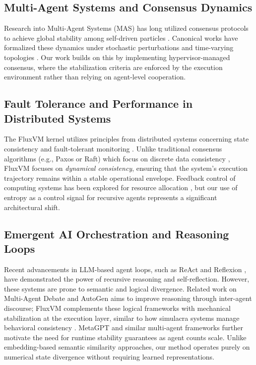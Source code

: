 \documentclass{article}
\begin{document}
\subsection{Multi-Agent Systems and Consensus Dynamics}
Research into Multi-Agent Systems (MAS) has long utilized consensus protocols to achieve global stability among self-driven particles \cite{vicsek1995novel, ren2008distributed}. Canonical works have formalized these dynamics under stochastic perturbations and time-varying topologies \cite{olfati2007consensus, mesbahi2010graph}. Our work builds on this by implementing hypervisor-managed consensus, where the stabilization criteria are enforced by the execution environment rather than relying on agent-level cooperation.

\subsection{Fault Tolerance and Performance in Distributed Systems}
The FluxVM kernel utilizes principles from distributed systems concerning state consistency and fault-tolerant monitoring \cite{tanenbaum2017distributed, lamport1978time}. Unlike traditional consensus algorithms (e.g., Paxos or Raft) which focus on discrete data consistency \cite{lynch1996distributed}, FluxVM focuses on \textit{dynamical consistency}, ensuring that the system's execution trajectory remains within a stable operational envelope. Feedback control of computing systems has been explored for resource allocation \cite{hellerstein2004feedback}, but our use of entropy as a control signal for recursive agents represents a significant architectural shift.

\subsection{Emergent AI Orchestration and Reasoning Loops}
Recent advancements in LLM-based agent loops, such as ReAct \cite{yao2022react} and Reflexion \cite{shinn2023reflexion}, have demonstrated the power of recursive reasoning and self-reflection. However, these systems are prone to semantic and logical divergence. Related work on Multi-Agent Debate \cite{du2023improving} and AutoGen \cite{hoover2023autogen} aims to improve reasoning through inter-agent discourse; FluxVM complements these logical frameworks with mechanical stabilization at the execution layer, similar to how simulacra systems manage behavioral consistency \cite{park2023generative}. MetaGPT \cite{hong2023metagpt} and similar multi-agent frameworks further motivate the need for runtime stability guarantees as agent counts scale. Unlike embedding-based semantic similarity approaches, our method operates purely on numerical state divergence without requiring learned representations.
\end{document}
